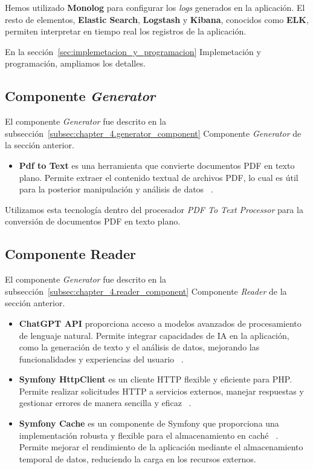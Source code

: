 Hemos utilizado \textbf{Monolog} para configurar los \textit{logs} generados en la aplicación.
El resto de elementos, \textbf{Elastic Search}, \textbf{Logstash} y \textbf{Kibana}, conocidos como \textbf{ELK},
permiten interpretar en tiempo real los registros de la aplicación.

En la sección~\ref{sec:implemetacion_y_programacion} Implemetación y programación, ampliamos los detalles.

\subsection*{Componente \textit{Generator}}

El componente \textit{Generator} fue descrito en la subsección~\ref{subsec:chapter_4.generator_component} Componente
\textit{Generator} de la sección anterior.

\begin{itemize}
    \item \textbf{Pdf to Text} es una herramienta que convierte documentos PDF en texto plano.
    Permite extraer el contenido textual de archivos PDF, lo cual es útil para la posterior manipulación y análisis de
    datos ~\cite{url_pdftotextl}.
\end{itemize}

Utilizamos esta tecnología dentro del procesador \textit{PDF To Text Processor} para la conversión de documentos PDF en
texto plano.

\subsection*{Componente Reader}

El componente \textit{Generator} fue descrito en la subsección~\ref{subsec:chapter_4.reader_component} Componente
\textit{Reader} de la sección anterior.

\begin{itemize}
    \item \textbf{ChatGPT API} proporciona acceso a modelos avanzados de procesamiento de lenguaje natural.
    Permite integrar capacidades de IA en la aplicación, como la generación de texto y el análisis de datos, mejorando
    las funcionalidades y experiencias del usuario ~\cite{url_chatgpt_api}.
    \item \textbf{Symfony HttpClient} es un cliente HTTP flexible y eficiente para PHP. Permite realizar solicitudes
    HTTP a servicios externos, manejar respuestas y gestionar errores de manera sencilla y eficaz
    ~\cite{url_symfony_http}.
    \item \textbf{Symfony Cache} es un componente de Symfony que proporciona una implementación robusta y flexible
    para el almacenamiento en caché ~\cite{url_symfony_cache}.
    Permite mejorar el rendimiento de la aplicación mediante el almacenamiento temporal de datos, reduciendo la carga en
    los recursos externos.
\end{itemize}

